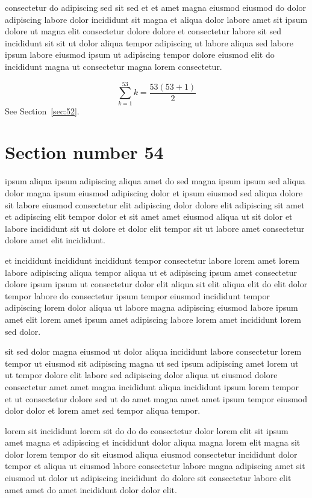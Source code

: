 \documentclass{article}
\begin{document}
consectetur do adipiscing sed sit sed et et amet magna eiusmod eiusmod do dolor adipiscing labore dolor incididunt sit magna et aliqua dolor labore amet sit ipsum dolore ut magna elit consectetur dolore dolore et consectetur labore sit sed incididunt sit sit ut dolor aliqua tempor adipiscing ut labore aliqua sed labore ipsum labore eiusmod ipsum ut adipiscing tempor dolore eiusmod elit do incididunt magna ut consectetur magna lorem consectetur.

\begin{equation} \sum_{k=1}^{53} k = \frac{53(53+1)}{2} \end{equation}
See Section~\ref{sec:52}.

\section{Section number 54}\label{sec:54}
ipsum aliqua ipsum adipiscing aliqua amet do sed magna ipsum ipsum sed aliqua dolor magna ipsum eiusmod adipiscing dolor et ipsum eiusmod sed aliqua dolore sit labore eiusmod consectetur elit adipiscing dolor dolore elit adipiscing sit amet et adipiscing elit tempor dolor et sit amet amet eiusmod aliqua ut sit dolor et labore incididunt sit ut dolore et dolor elit tempor sit ut labore amet consectetur dolore amet elit incididunt.

et incididunt incididunt incididunt tempor consectetur labore lorem amet lorem labore adipiscing aliqua tempor aliqua ut et adipiscing ipsum amet consectetur dolore ipsum ipsum ut consectetur dolor elit aliqua sit elit aliqua elit do elit dolor tempor labore do consectetur ipsum tempor eiusmod incididunt tempor adipiscing lorem dolor aliqua ut labore magna adipiscing eiusmod labore ipsum amet elit lorem amet ipsum amet adipiscing labore lorem amet incididunt lorem sed dolor.

sit sed dolor magna eiusmod ut dolor aliqua incididunt labore consectetur lorem tempor ut eiusmod sit adipiscing magna ut sed ipsum adipiscing amet lorem ut ut tempor dolore elit labore sed adipiscing dolor aliqua ut eiusmod dolore consectetur amet amet magna incididunt aliqua incididunt ipsum lorem tempor et ut consectetur dolore sed ut do amet magna amet amet ipsum tempor eiusmod dolor dolor et lorem amet sed tempor aliqua tempor.

lorem sit incididunt lorem sit do do do consectetur dolor lorem elit sit ipsum amet magna et adipiscing et incididunt dolor aliqua magna lorem elit magna sit dolor lorem tempor do sit eiusmod aliqua eiusmod consectetur incididunt dolor tempor et aliqua ut eiusmod labore consectetur labore magna adipiscing amet sit eiusmod ut dolor ut adipiscing incididunt do dolore sit consectetur labore elit amet amet do amet incididunt dolor dolor elit.
\end{document}
